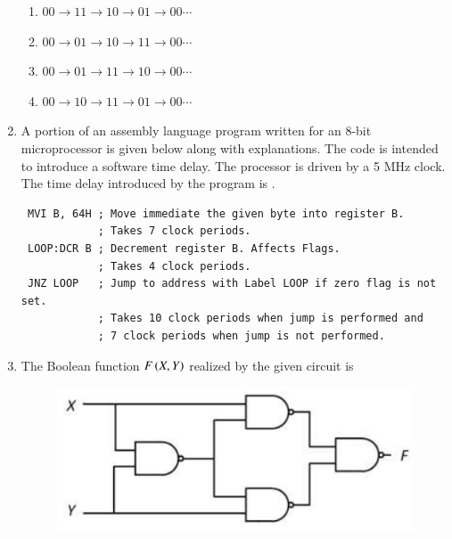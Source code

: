 \documentclass[journal,12pt,onecolumn]{IEEEtran}
\theoremstyle{remark}
\begin{document}
\begin{enumerate}
    \hfill{}
    \begin{enumerate}
        \item $00 \to 11 \to 10 \to 01 \to 00 \cdots$
        \item $00 \to 01 \to 10 \to 11 \to 00 \cdots$
        \item $00 \to 01 \to 11 \to 10 \to 00 \cdots$
        \item $00 \to 10 \to 11 \to 01 \to 00 \cdots$
    \end{enumerate}

    \item A portion of an assembly language program written for an 8-bit microprocessor is given below along with explanations. The code is intended to introduce a software time delay. The processor is driven by a 5 MHz clock. The time delay  introduced by the program is \underline{\hspace{2cm}}.
    \begin{verbatim}
 MVI B, 64H ; Move immediate the given byte into register B. 
            ; Takes 7 clock periods.
 LOOP:DCR B ; Decrement register B. Affects Flags. 
            ; Takes 4 clock periods.
 JNZ LOOP   ; Jump to address with Label LOOP if zero flag is not set.
            ; Takes 10 clock periods when jump is performed and 
            ; 7 clock periods when jump is not performed.
    \end{verbatim}
    
    \hfill{}
    \newpage
    \item The Boolean function $F\left( X, Y\right)$ realized by the given circuit is
    \begin{figure}[H]
        \centering
        \includegraphics[width=0.6\columnwidth]{q46.png}
        \caption*{}
        \label{fig:q46}
    \end{figure}
    
    \hfill{}
    \begin{enumerate}
    \end{enumerate}


\end{enumerate}
\end{document}
